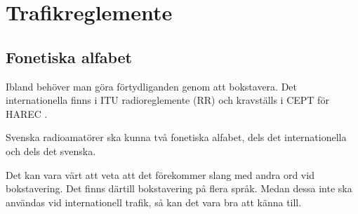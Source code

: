 \chapter{Trafikreglemente}

\section{Fonetiska alfabet}
\label{fonetiska_alfabet}

Ibland behöver man göra förtydliganden genom att bokstavera.
Det internationella finns i ITU radioreglemente (RR) \cite[Appendix 14]{ITU-RR}
och kravställs i CEPT för HAREC \cite[Annex 6]{TR6102}.

Svenska radioamatörer ska kunna två fonetiska alfabet, dels det
internationella och dels det svenska.

Det kan vara värt att veta att det förekommer slang med andra ord vid
bokstavering.
Det finns därtill bokstavering på flera språk.
Medan dessa inte ska användas vid internationell trafik, så kan det vara bra
att känna till.

